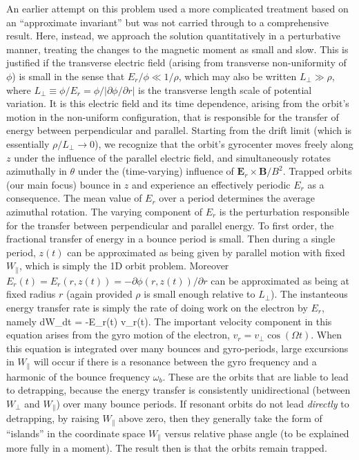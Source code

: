 \documentclass{agujournal2019}
\let\oldequation\equation
\let\oldendequation\endequation
\renewenvironment{equation}
  {\linenomathNonumbers\oldequation}
  {\oldendequation\endlinenomath}
\def\citep{\cite}
\begin{document}
An earlier attempt on this problem used a more complicated treatment
based on an ``approximate invariant'' \citep{Krasovsky2006} but was
not carried through to a comprehensive result.  Here,
instead, we approach the solution quantitatively in a perturbative
manner, treating the changes to the magnetic moment as small and
slow. This is justified if the transverse electric field (arising from
transverse non-uniformity of $\phi$) is small in the sense that
$E_r/\phi\ll 1/\rho$, which may also be written $L_\perp\gg \rho$,
where $L_\perp \equiv \phi/E_r=\phi/|\partial \phi/\partial r|$ is the
transverse length scale of potential variation. It is this electric
field and its time dependence, arising from the orbit's motion in the
non-uniform configuration, that is responsible for the transfer of
energy between perpendicular and parallel. Starting from the drift
limit (which is essentially $\rho/L_\perp\to 0$), we recognize that
the orbit's gyrocenter moves freely along $z$ under the influence of
the parallel electric field, and simultaneously rotates azimuthally in
$\theta$ under the (time-varying) influence of
$\bm{E}_r\times \bm{B}/B^2$.  Trapped orbits (our main focus) bounce
in $z$ and experience an effectively periodic $E_r$ as a
consequence. The mean value of $E_r$ over a period determines the
average azimuthal rotation. The varying component of $E_r$ is the
perturbation responsible for the transfer between perpendicular and
parallel energy. To first order, the fractional transfer of energy in
a bounce period is small. Then during a single period, $z(t)$ can be
approximated as being given by parallel motion with fixed
$W_\parallel$, which is simply the 1D orbit problem. Moreover
$E_r(t)=E_r(r,z(t))=-\partial \phi(r,z(t))/\partial r$ can be
approximated as being at fixed radius $r$ (again provided $\rho$ is
small enough relative to $L_\perp$). The instanteous energy transfer
rate is simply the rate of doing work on the electron by $E_r$, namely
\begin{equation}
  \label{eq:workrate}
  {dW_\parallel\over dt} = -E_r(t) v_r(t).
\end{equation}
The important velocity component in this equation arises from the gyro
motion of the electron, $v_r=v_\perp \cos(\Omega t)$. When this
equation is integrated over many bounces and gyro-periods, large
excursions in $W_\parallel$ will occur if there is a resonance
between the gyro frequency and a harmonic of the bounce frequency
$\omega_b$. These are the orbits that are liable to lead to
detrapping, because the energy transfer is consistently unidirectional
(between $W_\perp$ and $W_\parallel$) over many bounce periods. If
resonant orbits do not lead \emph{directly} to detrapping, by raising
$W_\parallel$ above zero, then they generally take the form of
``islands'' in the coordinate space $W_\parallel$ versus relative
phase angle (to be explained more fully in a moment). The result then
is that the orbits remain trapped.
\end{document}

